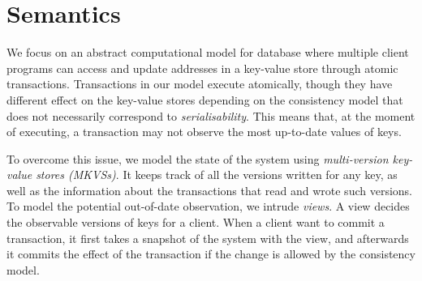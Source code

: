 \section{Semantics}
\label{sec:semantics}

We focus on an abstract computational model for database where multiple client programs can access and update addresses in a key-value store through atomic transactions. 
Transactions in our model execute atomically, though they have different effect on the key-value stores depending on the consistency model that does not necessarily correspond to \emph{serialisability}. 
This means that, at the moment of executing, a transaction may not observe the most up-to-date values of keys. 

To overcome this issue, we model the state of the system using \emph{multi-version key-value stores (MKVSs)}. 
It keeps track of all the versions written for any key, as well as the information about the transactions that read and wrote such versions. 
To model the potential out-of-date observation, we intrude \emph{views}.
A view decides the observable versions of keys for a client.
When a client want to commit a transaction, it first takes a snapshot of the system with the view, and afterwards it commits the effect of the transaction if the change is allowed by the consistency model.








